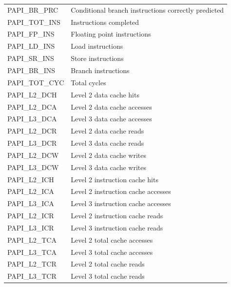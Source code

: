 \documentclass{sigplanconf}
\begin{document}
\begin{table}[H]
\begin{tabular}{ | L{2.2cm} | R{6cm} |  }
PAPI\_BR\_PRC & Conditional branch instructions correctly predicted                          \\ 
PAPI\_TOT\_INS & Instructions completed         \\                     
PAPI\_FP\_INS & Floating point instructions     \\                        
PAPI\_LD\_INS &  Load instructions            \\                 
PAPI\_SR\_INS  & Store instructions        \\                     
PAPI\_BR\_INS &  Branch instructions        \\                     
PAPI\_TOT\_CYC & Total cycles               \\               
PAPI\_L2\_DCH & Level 2 data cache hits        \\                   
PAPI\_L2\_DCA &  Level 2 data cache accesses     \\                     
PAPI\_L3\_DCA & Level 3 data cache accesses       \\                    
PAPI\_L2\_DCR  & Level 2 data cache reads  \\                        
PAPI\_L3\_DCR &  Level 3 data cache reads    \\                      
PAPI\_L2\_DCW &  Level 2 data cache writes    \\                      
PAPI\_L3\_DCW &  Level 3 data cache writes     \\                     
PAPI\_L2\_ICH &  Level 2 instruction cache hits     \\                     
PAPI\_L2\_ICA &  Level 2 instruction cache accesses   \\                       
PAPI\_L3\_ICA &  Level 3 instruction cache accesses   \\                       
PAPI\_L2\_ICR &  Level 2 instruction cache reads   \\                       
PAPI\_L3\_ICR &  Level 3 instruction cache reads      \\                    
PAPI\_L2\_TCA & Level 2 total cache accesses    \\                       
PAPI\_L3\_TCA &  Level 3 total cache accesses   \\                       
PAPI\_L2\_TCR & Level 2 total cache reads      \\                     
PAPI\_L3\_TCR & Level 3 total cache reads      \\                     

\end{tabular}
\end{table}
\end{document}
